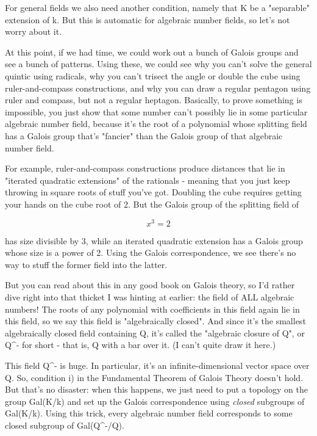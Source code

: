 For general fields we also need another condition, namely that K be a 
"separable" extension of k.  But this is automatic for algebraic number
fields, so let's not worry about it.  

At this point, if we had time, we could work out a bunch of Galois groups
and see a bunch of patterns.  Using these, we could see why you can't
solve the general quintic using radicals, why you can't trisect the angle 
or double the cube using ruler-and-compass constructions, and why you can
draw a regular pentagon using ruler and compass, but not a regular heptagon.
Basically, to prove something is impossible, you just show that some number
can't possibly lie in some particular algebraic number field, because it's 
the root of a polynomial whose splitting field has a Galois group that's 
"fancier" than the Galois group of that algebraic number field.  

For example, ruler-and-compass constructions produce distances that lie in 
"iterated quadratic extensions" of the rationals - meaning that you just 
keep throwing in square roots of stuff you've got.  Doubling the cube 
requires getting your hands on the cube root of 2.  But the Galois group 
of the splitting field of 


$$

x^{3} = 2
$$
    
has size divisible by 3, while an iterated quadratic extension has a Galois
group whose size is a power of 2.  Using the Galois correspondence, we see
there's no way to stuff the former field into the latter.

But you can read about this in any good book on Galois theory, so I'd rather
dive right into that thicket I was hinting at earlier: the field of ALL 
algebraic numbers!  The roots of any polynomial with coefficients in this 
field again lie in this field, so we say this field is "algebraically 
closed".  And since it's the smallest algebraically closed field containing 
Q, it's called the "algebraic closure of Q", or Q^{-} for short - that is, Q 
with a bar over it.  (I can't quite draw it here.)

This field Q^{-} is huge.  In particular, it's an infinite-dimensional vector 
space over Q.  So, condition i) in the Fundamental Theorem of Galois Theory 
doesn't hold.  But that's no disaster: when this happens, we just need to 
put a topology on the group Gal(K/k) and set up the Galois correspondence using
\emph{closed} subgroups of Gal(K/k).  Using this trick, every algebraic number field
corresponds to some closed subgroup of Gal(Q^{-}/Q).

